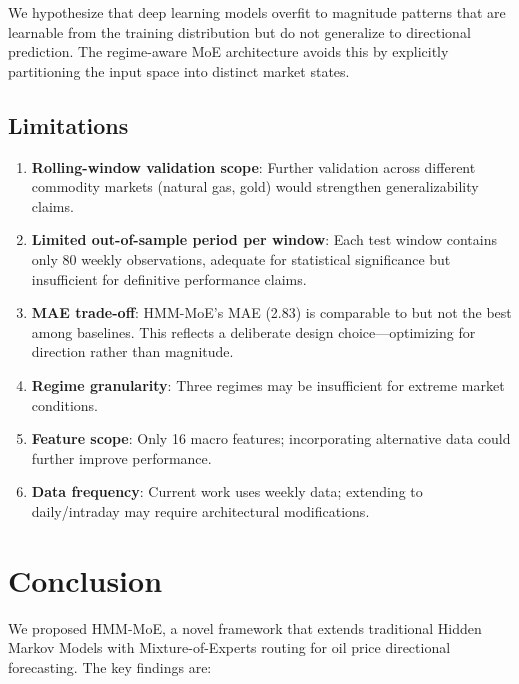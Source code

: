 \documentclass[3p,times]{elsarticle}
\begin{document}
We hypothesize that deep learning models overfit to magnitude patterns that are learnable from the training distribution but do not generalize to directional prediction. The regime-aware MoE architecture avoids this by explicitly partitioning the input space into distinct market states.

\subsection{Limitations}

\begin{enumerate}
\item \textbf{Rolling-window validation scope}: Further validation across different commodity markets (natural gas, gold) would strengthen generalizability claims.

\item \textbf{Limited out-of-sample period per window}: Each test window contains only 80 weekly observations, adequate for statistical significance but insufficient for definitive performance claims.

\item \textbf{MAE trade-off}: HMM-MoE's MAE (2.83) is comparable to but not the best among baselines. This reflects a deliberate design choice---optimizing for direction rather than magnitude.

\item \textbf{Regime granularity}: Three regimes may be insufficient for extreme market conditions.

\item \textbf{Feature scope}: Only 16 macro features; incorporating alternative data could further improve performance.

\item \textbf{Data frequency}: Current work uses weekly data; extending to daily/intraday may require architectural modifications.
\end{enumerate}

\section{Conclusion}
\label{sec:conclusion}

We proposed HMM-MoE, a novel framework that extends traditional Hidden Markov Models with Mixture-of-Experts routing for oil price directional forecasting. The key findings are:
\end{document}
